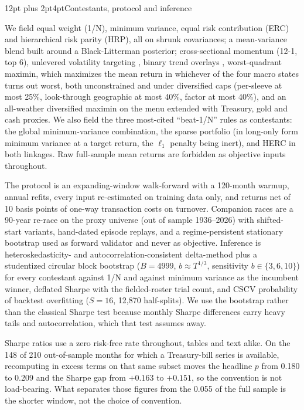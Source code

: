 \documentclass[12pt,letterpaper]{article}
\makeatletter
\renewcommand{\subsection}{\@startsection{subsection}{2}{\parindent}%
  {12pt plus 2pt}{4pt}{\normalfont\bfseries}}
\makeatother
\begin{document}
\subsection{Contestants, protocol and inference}

We field equal weight (1/N), minimum variance, equal risk contribution (ERC) and
hierarchical risk parity (HRP), all on \citet{ledoit2004} shrunk covariances; a
mean-variance blend built around a Black-Litterman posterior;
cross-sectional momentum (12-1, top 6), unlevered volatility targeting
\citep{moreira2017}, binary trend overlays \citep{faber2007,antonacci2014},
worst-quadrant maximin, which maximizes the mean return in whichever of the four macro states turns out worst, both unconstrained and under diversified caps (per-sleeve at most 25\%, look-through geographic at most 40\%, factor at most 40\%), and an
all-weather diversified maximin on the menu extended with Treasury, gold and cash
proxies. We also field the three most-cited ``beat-1/N'' rules as contestants: the
\citet{yuan2023} global minimum-variance combination, the \citet{brodie2009}
sparse portfolio (in long-only form minimum variance at a target return, the
$\ell_1$ penalty being inert), and HERC in both linkages. Raw full-sample mean
returns are forbidden as objective inputs throughout.

The protocol is an expanding-window walk-forward with a 120-month warmup, annual
refits, every input re-estimated on training data only, and returns net of 10
basis points of one-way transaction costs on turnover. Companion races are a
90-year re-race on the proxy universe (out of sample 1936--2026) with
shifted-start variants, hand-dated episode replays, and a regime-persistent
stationary bootstrap used as forward validator and never as objective. Inference
is \citet{ledoit2008} heteroskedasticity- and autocorrelation-consistent
delta-method plus a studentized circular block bootstrap ($B = 4999$,
$b \approx T^{1/3}$, sensitivity $b \in \{3,6,10\}$) for every contestant against 1/N and against minimum variance as the incumbent winner, deflated Sharpe with the fielded-roster
trial count, and CSCV probability of backtest overfitting ($S = 16$, 12,870
half-splits). We use the bootstrap rather than the classical Sharpe test because
monthly Sharpe differences carry heavy tails and autocorrelation, which that test
assumes away.

Sharpe ratios use a zero risk-free rate throughout, tables and text alike. On the
148 of 210 out-of-sample months for which a Treasury-bill series is available,
recomputing in excess terms on that same subset moves the headline $p$ from 0.180
to 0.209 and the Sharpe gap from $+0.163$ to $+0.151$, so the convention is not
load-bearing. What separates those figures from the 0.055 of the full sample is
the shorter window, not the choice of convention.
\end{document}
